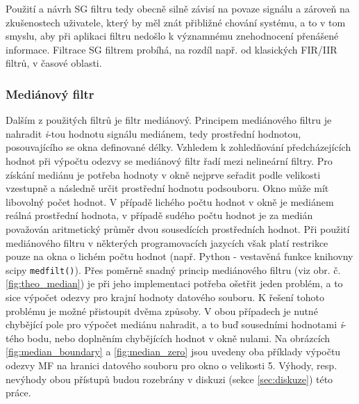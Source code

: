 \documentclass[a4paper, 12pt]{article}
\begin{document}
\noindent Použití a návrh SG filtru tedy obecně silně závisí na povaze signálu a zároveň na zkušenostech uživatele, který by měl znát přibližné chování systému, a to v tom smyslu, aby při aplikaci filtru nedošlo k významnému znehodnocení přenášené informace.
\vskip 0.1in
\noindent Filtrace SG filtrem probíhá, na rozdíl např. od klasických FIR/IIR filtrů, v časové oblasti.

\subsubsection{Mediánový filtr}
\label{sec:filtr3}
Dalším z použitých filtrů je filtr mediánový. Principem mediánového filtru je nahradit \textit{i}-tou hodnotu signálu mediánem, tedy prostřední hodnotou, posouvajícího se okna definované délky. Vzhledem k zohledňování předcházejících hodnot při výpočtu odezvy se mediánový filtr řadí mezi nelineární filtry. Pro získání mediánu je potřeba hodnoty v okně nejprve seřadit podle velikosti vzestupně a následně určit prostřední hodnotu podsouboru. Okno může mít libovolný počet hodnot. V případě lichého počtu hodnot v okně je mediánem reálná prostřední hodnota, v případě sudého počtu hodnot je za medián považován aritmetický průměr dvou sousedících prostředních hodnot. Při použití mediánového filtru v některých programovacích jazycích však platí restrikce pouze na okna o lichém počtu hodnot (např. Python - vestavěná funkce knihovny scipy \texttt{medfilt()}). Přes poměrně snadný princip mediánového filtru (viz obr. č. \ref{fig:theo_median}) je při jeho implementaci potřeba ošetřit jeden problém, a to sice výpočet odezvy pro krajní hodnoty datového souboru. K řešení tohoto problému je možné přistoupit dvěma způsoby. V obou případech je nutné chybějící pole pro výpočet mediánu nahradit, a to buď sousedními hodnotami \textit{i}-tého bodu, nebo doplněním chybějících hodnot v okně nulami. Na obrázcích \ref{fig:median_boundary} a \ref{fig:median_zero} jsou uvedeny oba příklady výpočtu odezvy MF na hranici datového souboru pro okno o velikosti 5. Výhody, resp. nevýhody obou přístupů budou rozebrány v diskuzi (sekce \ref{sec:diskuze}) této práce.\vspace{6cm}
\end{document}

